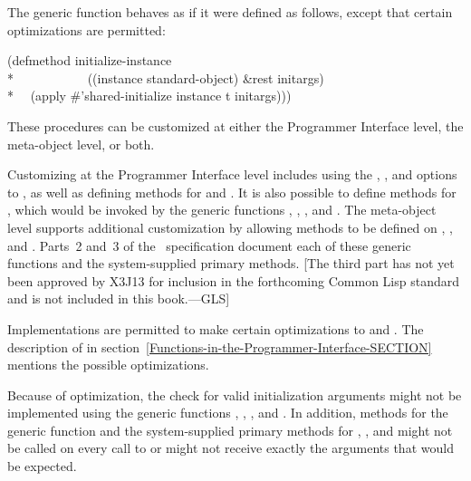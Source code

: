 The generic function  behaves as if it were
defined as follows, except that certain optimizations are permitted:

\begin{lisp}
(defmethod initialize-instance \\*
~~~~~~~~~~~((instance standard-object) \&rest initargs) \\*
~~(apply \#'shared-initialize instance t initargs)))
\end{lisp}

These procedures can be customized at either the Programmer Interface level,
the meta-object level, or both.  

Customizing at the Programmer Interface level includes using the 
, , and  options to
, as well as defining methods for 
and .  It is also possible to define
methods for , which would be invoked by the
generic functions , 
, 
, and 
.  The meta-object level supports additional
customization by allowing methods to be defined on 
, , and 
.  Parts~2 and~3 of the \CLOS\ specification document each of these generic
functions and the system-supplied primary methods.
[The third part
has not yet been approved by X3J13 for inclusion in the forthcoming
Common Lisp standard and is not included in this book.---GLS]

Implementations are permitted to make certain optimizations to 
 and .  The
description of  in
section~\ref{Functions-in-the-Programmer-Interface-SECTION}
mentions the
possible optimizations.

Because of optimization, the check for valid initialization arguments
might not be implemented using the generic functions 
, , 
, and . In addition,
methods for the generic function  and the
system-supplied primary methods for , 
,
and  might not be called on
every call to  or might not receive exactly the
arguments that would be expected.


